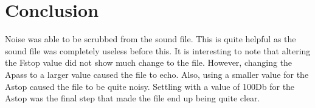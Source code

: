 \documentclass[conference]{IEEEtran}
\begin{document}
\section{Conclusion}
Noise was able to be scrubbed from the sound file. This is quite helpful as the sound file was completely useless before this. It is interesting to note that altering the Fstop value did not show much change to the file. However, changing the Apass to a larger value caused the file to echo. Also, using a smaller value for the Astop caused the file to be quite noisy. Settling with a value of 100Db for the Astop was the final step that made the file end up being quite clear.

{\footnotesize


}
\end{document}
